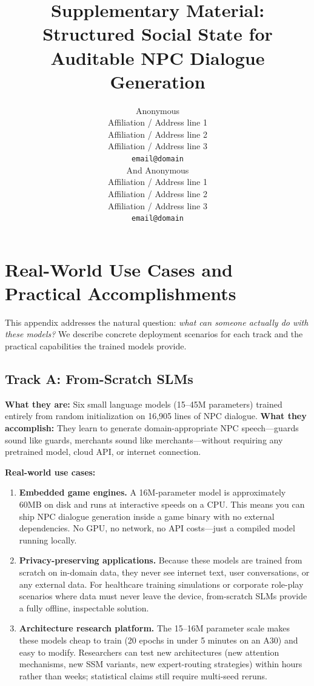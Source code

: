 \documentclass[11pt]{article}
\title{Supplementary Material: Structured Social State for Auditable NPC Dialogue Generation}
\author{Anonymous \\ Affiliation / Address line 1 \\ Affiliation / Address line 2 \\ Affiliation / Address line 3 \\ \texttt{email@domain} \\And Anonymous \\ Affiliation / Address line 1 \\ Affiliation / Address line 2 \\ Affiliation / Address line 3 \\ \texttt{email@domain} \\}
\begin{document}
\maketitle

\appendix

\section{Real-World Use Cases and Practical Accomplishments}
\label{app:usecases}

This appendix addresses the natural question: \textit{what can someone actually do with these models?}
We describe concrete deployment scenarios for each track and the practical capabilities the trained models provide.

\subsection{Track A: From-Scratch SLMs}

\textbf{What they are:} Six small language models (15--45M parameters) trained entirely from random initialization on 16,905 lines of NPC dialogue.
\textbf{What they accomplish:} They learn to generate domain-appropriate NPC speech---guards sound like guards, merchants sound like merchants---without requiring any pretrained model, cloud API, or internet connection.

\textbf{Real-world use cases:}
\begin{enumerate}
    \item \textbf{Embedded game engines.} A 16M-parameter model is approximately 60MB on disk and runs at interactive speeds on a CPU.
    This means you can ship NPC dialogue generation inside a game binary with no external dependencies.
    No GPU, no network, no API costs---just a compiled model running locally.
    \item \textbf{Privacy-preserving applications.} Because these models are trained from scratch on in-domain data, they never see internet text, user conversations, or any external data.
    For healthcare training simulations or corporate role-play scenarios where data must never leave the device, from-scratch SLMs provide a fully offline, inspectable solution.
    \item \textbf{Architecture research platform.} The 15--16M parameter scale makes these models cheap to train (20 epochs in under 5 minutes on an A30) and easy to modify.
    Researchers can test new architectures (new attention mechanisms, new SSM variants, new expert-routing strategies) within hours rather than weeks; statistical claims still require multi-seed reruns.
\end{enumerate}
\end{document}
